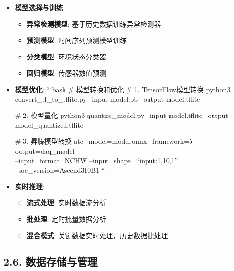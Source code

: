 \begin{itemize}
\item
  \textbf{模型选择与训练}:

  \begin{itemize}
  \tightlist
  \item
    \textbf{异常检测模型}: 基于历史数据训练异常检测器
  \item
    \textbf{预测模型}: 时间序列预测模型训练
  \item
    \textbf{分类模型}: 环境状态分类器
  \item
    \textbf{回归模型}: 传感器数值预测
  \end{itemize}
\item
  \textbf{模型优化}: ```bash \# 模型转换和优化 \# 1. TensorFlow模型转换
  python3 convert\_tf\_to\_tflite.py --input model.pb --output
  model.tflite

  \# 2. 模型量化 python3 quantize\_model.py --input model.tflite
  --output model\_quantized.tflite

  \# 3. 昇腾模型转换 atc --model=model.onnx --framework=5
  --output=daq\_model\\
  --input\_format=NCHW --input\_shape=``input:1,10,1''\\
  --soc\_version=Ascend310B1 ```
\item
  \textbf{实时推理}:

  \begin{itemize}
  \tightlist
  \item
    \textbf{流式处理}: 实时数据流分析
  \item
    \textbf{批处理}: 定时批量数据分析
  \item
    \textbf{混合模式}: 关键数据实时处理，历史数据批处理
  \end{itemize}
\end{itemize}

\subsection{2.6.
数据存储与管理}\label{ux6570ux636eux5b58ux50a8ux4e0eux7ba1ux7406}


